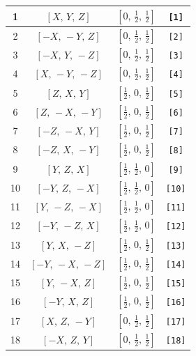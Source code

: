 \documentclass[fleqn,8pt]{jsarticle}
\begin{document}
\begin{longtable}{cccc}
1 & $\left[ X,\, Y,\, Z \right]$ & $\left[ 0,\, \frac{1}{2},\, \frac{1}{2} \right]$ & {\tt [1]} \\ \hline
2 & $\left[ - X,\, - Y,\, Z \right]$ & $\left[ 0,\, \frac{1}{2},\, \frac{1}{2} \right]$ & {\tt [2]} \\ \hline
3 & $\left[ - X,\, Y,\, - Z \right]$ & $\left[ 0,\, \frac{1}{2},\, \frac{1}{2} \right]$ & {\tt [3]} \\ \hline
4 & $\left[ X,\, - Y,\, - Z \right]$ & $\left[ 0,\, \frac{1}{2},\, \frac{1}{2} \right]$ & {\tt [4]} \\ \hline
5 & $\left[ Z,\, X,\, Y \right]$ & $\left[ \frac{1}{2},\, 0,\, \frac{1}{2} \right]$ & {\tt [5]} \\ \hline
6 & $\left[ Z,\, - X,\, - Y \right]$ & $\left[ \frac{1}{2},\, 0,\, \frac{1}{2} \right]$ & {\tt [6]} \\ \hline
7 & $\left[ - Z,\, - X,\, Y \right]$ & $\left[ \frac{1}{2},\, 0,\, \frac{1}{2} \right]$ & {\tt [7]} \\ \hline
8 & $\left[ - Z,\, X,\, - Y \right]$ & $\left[ \frac{1}{2},\, 0,\, \frac{1}{2} \right]$ & {\tt [8]} \\ \hline
9 & $\left[ Y,\, Z,\, X \right]$ & $\left[ \frac{1}{2},\, \frac{1}{2},\, 0 \right]$ & {\tt [9]} \\ \hline
10 & $\left[ - Y,\, Z,\, - X \right]$ & $\left[ \frac{1}{2},\, \frac{1}{2},\, 0 \right]$ & {\tt [10]} \\ \hline
11 & $\left[ Y,\, - Z,\, - X \right]$ & $\left[ \frac{1}{2},\, \frac{1}{2},\, 0 \right]$ & {\tt [11]} \\ \hline
12 & $\left[ - Y,\, - Z,\, X \right]$ & $\left[ \frac{1}{2},\, \frac{1}{2},\, 0 \right]$ & {\tt [12]} \\ \hline
13 & $\left[ Y,\, X,\, - Z \right]$ & $\left[ \frac{1}{2},\, 0,\, \frac{1}{2} \right]$ & {\tt [13]} \\ \hline
14 & $\left[ - Y,\, - X,\, - Z \right]$ & $\left[ \frac{1}{2},\, 0,\, \frac{1}{2} \right]$ & {\tt [14]} \\ \hline
15 & $\left[ Y,\, - X,\, Z \right]$ & $\left[ \frac{1}{2},\, 0,\, \frac{1}{2} \right]$ & {\tt [15]} \\ \hline
16 & $\left[ - Y,\, X,\, Z \right]$ & $\left[ \frac{1}{2},\, 0,\, \frac{1}{2} \right]$ & {\tt [16]} \\ \hline
17 & $\left[ X,\, Z,\, - Y \right]$ & $\left[ 0,\, \frac{1}{2},\, \frac{1}{2} \right]$ & {\tt [17]} \\ \hline
18 & $\left[ - X,\, Z,\, Y \right]$ & $\left[ 0,\, \frac{1}{2},\, \frac{1}{2} \right]$ & {\tt [18]} \\ \hline

\end{longtable}
\end{document}
